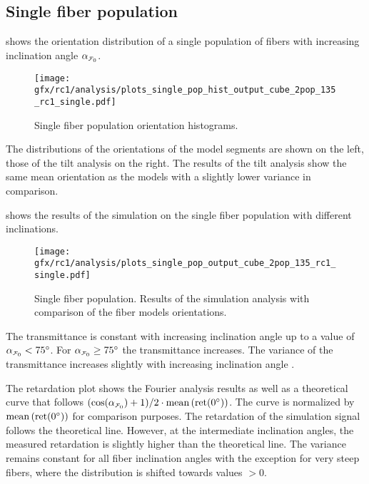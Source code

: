 \subsection{Single fiber population}
\label{sec:resSingleIncl}
%
 shows the orientation distribution of a single population of fibers with increasing inclination angle $\modelInc{}$.
%
\begin{figure}[!t]
    \centering
    \texttt{[image: gfx/rc1/analysis/plots\_single\_pop\_hist\_output\_cube\_2pop\_135\_rc1\_single.pdf]}
    \caption[]{Single fiber population orientation histograms.}
    \label{fig:single_fiber_pop_hist}
\end{figure}
%
The distributions of the orientations of the model segments are shown on the left, those of the tilt analysis on the right.
The results of the tilt analysis show the same mean orientation as the models with a slightly lower variance in comparison.
\par
%
 shows the results of the simulation on the single fiber population with different inclinations.
\par
%
\begin{figure}[!p]
    \centering
    \texttt{[image: gfx/rc1/analysis/plots\_single\_pop\_output\_cube\_2pop\_135\_rc1\_single.pdf]}
    \caption[]{Single fiber population. Results of the simulation analysis with comparison of the fiber models orientations.}
    \label{fig:single_fiber_pop_rofl}
\end{figure}
%
The transmittance is constant with increasing inclination angle up to a value of $\modelInc<\SI{75}{\degree}$.
For $\modelInc \ge \SI{75}{\degree}$ the transmittance increases.
The variance of the transmittance increases slightly with increasing inclination angle \modelInc{}.
\par
%
The retardation plot shows the Fourier analysis results as well as a theoretical curve that follows $(\cos(\modelInc) + 1) / 2 \cdot \mean\left(\mathrm{ret}(\SI{0}{\degree})\right)$.
The curve is normalized by $\operatorname{mean}\left(\mathrm{ret}(\SI{0}{\degree})\right)$ for comparison purposes.
The retardation of the simulation signal follows the theoretical line.
However, at the intermediate inclination angles, the measured retardation is slightly higher than the theoretical line.
The variance remains constant for all fiber inclination angles \modelInc{} with the exception for very steep fibers, where the distribution is shifted towards values $>0$.
\par
